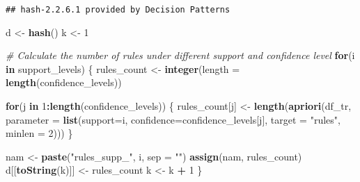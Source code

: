 \documentclass[]{article}
\newenvironment{Shaded}{\begin{snugshade}}{\end{snugshade}}
\newcommand{\CommentTok}[1]{\textcolor[rgb]{0.56,0.35,0.01}{\textit{#1}}}
\newcommand{\ControlFlowTok}[1]{\textcolor[rgb]{0.13,0.29,0.53}{\textbf{#1}}}
\newcommand{\DataTypeTok}[1]{\textcolor[rgb]{0.13,0.29,0.53}{#1}}
\newcommand{\DecValTok}[1]{\textcolor[rgb]{0.00,0.00,0.81}{#1}}
\newcommand{\KeywordTok}[1]{\textcolor[rgb]{0.13,0.29,0.53}{\textbf{#1}}}
\newcommand{\NormalTok}[1]{#1}
\newcommand{\OperatorTok}[1]{\textcolor[rgb]{0.81,0.36,0.00}{\textbf{#1}}}
\newcommand{\StringTok}[1]{\textcolor[rgb]{0.31,0.60,0.02}{#1}}
\begin{document}
\begin{verbatim}
## hash-2.2.6.1 provided by Decision Patterns
\end{verbatim}

\begin{Shaded}
\begin{Highlighting}[]
\NormalTok{d <-}\StringTok{ }\KeywordTok{hash}\NormalTok{()}
\NormalTok{k <-}\StringTok{ }\DecValTok{1}

\CommentTok{# Calculate the number of rules under different support and confidence level}
\ControlFlowTok{for}\NormalTok{(i }\ControlFlowTok{in}\NormalTok{ support_levels) \{}
\NormalTok{  rules_count <-}\StringTok{ }\KeywordTok{integer}\NormalTok{(}\DataTypeTok{length =} \KeywordTok{length}\NormalTok{(confidence_levels))}
  
  \ControlFlowTok{for}\NormalTok{(j }\ControlFlowTok{in} \DecValTok{1}\OperatorTok{:}\KeywordTok{length}\NormalTok{(confidence_levels)) \{}
\NormalTok{    rules_count[j] <-}\StringTok{ }\KeywordTok{length}\NormalTok{(}\KeywordTok{apriori}\NormalTok{(df_tr, }\DataTypeTok{parameter =} \KeywordTok{list}\NormalTok{(}\DataTypeTok{support=}\NormalTok{i, }\DataTypeTok{confidence=}\NormalTok{confidence_levels[j], }\DataTypeTok{target =} \StringTok{"rules"}\NormalTok{, }\DataTypeTok{minlen =} \DecValTok{2}\NormalTok{)))}
\NormalTok{  \}}

\NormalTok{  nam <-}\StringTok{ }\KeywordTok{paste}\NormalTok{(}\StringTok{"rules_supp_"}\NormalTok{, i, }\DataTypeTok{sep =} \StringTok{""}\NormalTok{)}
  \KeywordTok{assign}\NormalTok{(nam, rules_count)}
\NormalTok{  d[[}\KeywordTok{toString}\NormalTok{(k)]] <-}\StringTok{ }\NormalTok{rules_count}
\NormalTok{  k <-}\StringTok{ }\NormalTok{k }\OperatorTok{+}\StringTok{ }\DecValTok{1}
\NormalTok{\}}
\end{Highlighting}
\end{Shaded}
\end{document}
